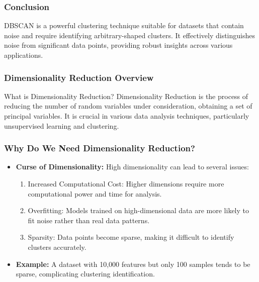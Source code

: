 \documentclass[aspectratio=169]{beamer}
\begin{document}
\begin{frame}
  \frametitle{Conclusion}
  DBSCAN is a powerful clustering technique suitable for datasets that contain noise and require identifying arbitrary-shaped clusters. It effectively distinguishes noise from significant data points, providing robust insights across various applications.
\end{frame}

\begin{frame}[fragile]
    \frametitle{Dimensionality Reduction Overview}
    \begin{block}{What is Dimensionality Reduction?}
        Dimensionality Reduction is the process of reducing the number of random variables under consideration, obtaining a set of principal variables. It is crucial in various data analysis techniques, particularly unsupervised learning and clustering.
    \end{block}
\end{frame}

\begin{frame}[fragile]
    \frametitle{Why Do We Need Dimensionality Reduction?}
    \begin{itemize}
        \item \textbf{Curse of Dimensionality:} High dimensionality can lead to several issues:
        \begin{enumerate}
            \item Increased Computational Cost: Higher dimensions require more computational power and time for analysis.
            \item Overfitting: Models trained on high-dimensional data are more likely to fit noise rather than real data patterns.
            \item Sparsity: Data points become sparse, making it difficult to identify clusters accurately.
        \end{enumerate}
        \item \textbf{Example:} A dataset with 10,000 features but only 100 samples tends to be sparse, complicating clustering identification.
    \end{itemize}
\end{frame}
\end{document}
